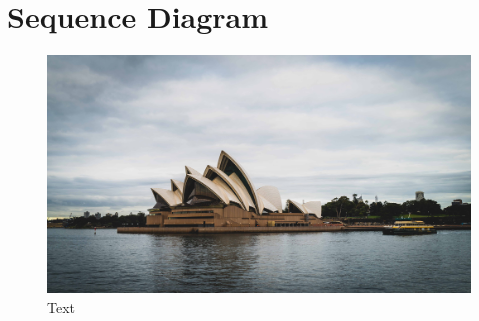 \section{Sequence Diagram}

\begin{figure}[htbp]
    \center
    \includegraphics[scale=0.07]{img/photo.jpg}
    \caption{Text}
\end{figure}

